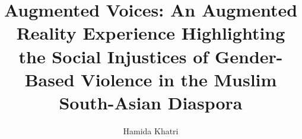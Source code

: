 \documentclass[manuscript,screen]{acmart}
\begin{document}
\title{\textbf{Augmented Voices: An Augmented Reality Experience Highlighting the Social Injustices of Gender-Based Violence in the Muslim South-Asian Diaspora}}

\author{Hamida Khatri}

\end{document}
